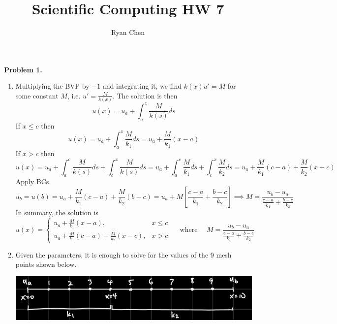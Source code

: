 \documentclass{article}
\title{Scientific Computing HW 7}
\author{Ryan Chen}
\def\tbf#1{\textbf{#1}}
\newcommand{\sbr}[1]{\left[#1\right]}
\newcommand{\imp}{\implies}
\begin{document}
	
\maketitle



\tbf{Problem 1.}

\begin{enumerate}[label=(\alph*)]
	
\item Multiplying the BVP by $-1$ and integrating it, we find $k(x)u'=M$ for some constant $M$, i.e. $u'=\frac{M}{k(x)}$. The solution is then
$$u(x) = u_a + \int_a^x \frac{M}{k(s)}ds$$
If $x\le c$ then
$$u(x) = u_a + \int_a^x \frac{M}{k_1}ds = u_a + \frac{M}{k_1}(x-a)$$
If $x>c$ then
$$u(x) = u_a + \int_a^c \frac{M}{k(s)}ds + \int_c^x \frac{M}{k(s)}ds
= u_a + \int_a^c \frac{M}{k_1}ds + \int_c^x \frac{M}{k_2}ds
= u_a + \frac{M}{k_1}(c - a) + \frac{M}{k_2}(x - c)$$
Apply BCs.
$$u_b = u(b)
= u_a + \frac{M}{k_1}(c - a) + \frac{M}{k_2}(b - c)
= u_a + M\sbr{\frac{c-a}{k_1} + \frac{b-c}{k_2}}
\imp M = \frac{u_b-u_a}{\frac{c-a}{k_1}+\frac{b-c}{k_2}}$$
In summary, the solution is
$$u(x) = 
\begin{cases}
	u_a + \frac{M}{k_1}(x-a), & x\le c\\
	u_a + \frac{M}{k_1}(c - a) + \frac{M}{k_2}(x - c), & x>c
\end{cases}
\quad \text{ where }
\quad M = \frac{u_b-u_a}{\frac{c-a}{k_1}+\frac{b-c}{k_2}}$$


\item Given the parameters, it is enough to solve for the values of the 9 mesh points shown below.
\begin{center}
	\includegraphics[scale=.09]{hw7 q1 mesh}
\end{center}


\end{enumerate}
\end{document}
